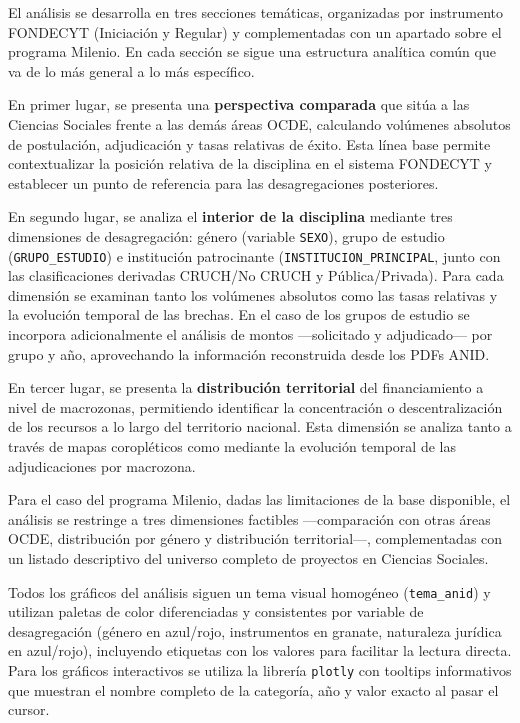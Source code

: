 \documentclass[
  12pt,
  letterpaper,
]{article}
\begin{document}
El análisis se desarrolla en tres secciones temáticas, organizadas por
instrumento FONDECYT (Iniciación y Regular) y complementadas con un
apartado sobre el programa Milenio. En cada sección se sigue una
estructura analítica común que va de lo más general a lo más específico.

En primer lugar, se presenta una \textbf{perspectiva comparada} que
sitúa a las Ciencias Sociales frente a las demás áreas OCDE, calculando
volúmenes absolutos de postulación, adjudicación y tasas relativas de
éxito. Esta línea base permite contextualizar la posición relativa de la
disciplina en el sistema FONDECYT y establecer un punto de referencia
para las desagregaciones posteriores.

En segundo lugar, se analiza el \textbf{interior de la disciplina}
mediante tres dimensiones de desagregación: género (variable
\texttt{SEXO}), grupo de estudio (\texttt{GRUPO\_ESTUDIO}) e institución
patrocinante (\texttt{INSTITUCION\_PRINCIPAL}, junto con las
clasificaciones derivadas CRUCH/No CRUCH y Pública/Privada). Para cada
dimensión se examinan tanto los volúmenes absolutos como las tasas
relativas y la evolución temporal de las brechas. En el caso de los
grupos de estudio se incorpora adicionalmente el análisis de montos
---solicitado y adjudicado--- por grupo y año, aprovechando la
información reconstruida desde los PDFs ANID.

En tercer lugar, se presenta la \textbf{distribución territorial} del
financiamiento a nivel de macrozonas, permitiendo identificar la
concentración o descentralización de los recursos a lo largo del
territorio nacional. Esta dimensión se analiza tanto a través de mapas
coropléticos como mediante la evolución temporal de las adjudicaciones
por macrozona.

Para el caso del programa Milenio, dadas las limitaciones de la base
disponible, el análisis se restringe a tres dimensiones factibles
---comparación con otras áreas OCDE, distribución por género y
distribución territorial---, complementadas con un listado descriptivo
del universo completo de proyectos en Ciencias Sociales.

Todos los gráficos del análisis siguen un tema visual homogéneo
(\texttt{tema\_anid}) y utilizan paletas de color diferenciadas y
consistentes por variable de desagregación (género en azul/rojo,
instrumentos en granate, naturaleza jurídica en azul/rojo), incluyendo
etiquetas con los valores para facilitar la lectura directa. Para los
gráficos interactivos se utiliza la librería \texttt{plotly} con
tooltips informativos que muestran el nombre completo de la categoría,
año y valor exacto al pasar el cursor.
\end{document}
